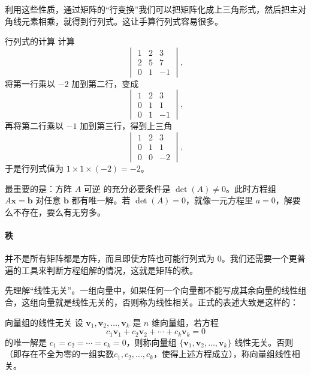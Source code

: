 利用这些性质，通过矩阵的“行变换”我们可以把矩阵化成上三角形式，然后把主对角线元素相乘，就得到行列式。这让手算行列式容易很多。

\begin{example}{行列式的计算}{}
    计算
    \[
        \begin{vmatrix}
            1 & 2 & 3 \\
            2 & 5 & 7 \\
            0 & 1 & -1
        \end{vmatrix},
    \]
    \tcblower
    将第一行乘以 \(-2\) 加到第二行，变成
    \[
        \begin{vmatrix}
            1 & 2 & 3 \\
            0 & 1 & 1 \\
            0 & 1 & -1
        \end{vmatrix},
    \]
    再将第二行乘以 \(-1\) 加到第三行，得到上三角
    \[
        \begin{vmatrix}
            1 & 2 & 3 \\
            0 & 1 & 1 \\
            0 & 0 & -2
        \end{vmatrix},
    \]
    于是行列式值为 \(1 \times 1 \times (-2) = -2\)。
\end{example}

最重要的是：方阵 \(A\) 可逆 的充分必要条件是 \(\det(A) \neq 0\)。此时方程组 \(A\mathbf{x} = \mathbf{b}\) 对任意 \(\mathbf{b}\) 都有唯一解。若 \(\det(A) = 0\)，就像一元方程里 \(a=0\)，解要么不存在，要么有无穷多。

\paragraph{秩}

并不是所有矩阵都是方阵，而且即使方阵也可能行列式为 \(0\)。我们还需要一个更普遍的工具来判断方程组解的情况，这就是矩阵的秩。

先理解“线性无关”。一组向量中，如果任何一个向量都不能写成其余向量的线性组合，这组向量就是线性无关的，否则称为线性相关。正式的表述大致是这样的：
\begin{definition}{向量组的线性无关}
    设 \(\mathbf{v}_1, \mathbf{v}_2, \ldots, \mathbf{v}_k\) 是 \(n\) 维向量组，若方程
    \[
        c_1 \mathbf{v}_1 + c_2 \mathbf{v}_2 + \cdots + c_k \mathbf{v}_k = 0
    \]
    的唯一解是 \(c_1 = c_2 = \cdots = c_k = 0\)，则称向量组 \(\{\mathbf{v}_1, \mathbf{v}_2, \ldots, \mathbf{v}_k\}\) 线性无关。否则（即存在不全为零的一组实数$c_1, c_2, \ldots, c_k$，使得上述方程成立），称向量组线性相关。
\end{definition}

